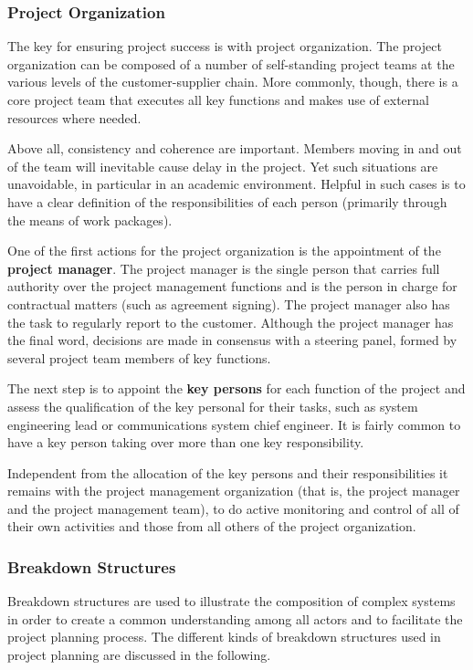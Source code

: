 \subsubsection{Project Organization}

The key for ensuring project success is with project organization. The project organization can be composed of a number of self-standing project teams at the various levels of the customer-supplier chain. More commonly, though, there is a core project team that executes all key functions and makes use of external resources where needed. 

Above all, consistency and coherence are important. Members moving in and out of the team will inevitable cause delay in the project. Yet such situations are unavoidable, in particular in an academic environment. Helpful in such cases is to have a clear definition of the responsibilities of each person (primarily through the means of work packages). 

One of the first actions for the project organization is the appointment of the \textbf{project manager}. The project manager is the single person that carries full authority over the project management functions and is the person in charge for contractual matters (such as agreement signing). The project manager also has the task to regularly report to the customer. Although the project manager has the final word, decisions are made in consensus with a steering panel, formed by several project team members of key functions. 

The next step is to appoint the \textbf{key persons} for each function of the project and assess the qualification of the key personal for their tasks, such as system engineering lead or communications system chief engineer. It is fairly common to have a key person taking over more than one key responsibility.

Independent from the allocation of the key persons and their responsibilities it remains with the project management organization (that is, the project manager and the project management team), to do active monitoring and control of all of their own activities and those from all others of the project organization. 

\subsubsection{Breakdown Structures}

Breakdown structures are used to illustrate the composition of complex systems in order to create a common understanding among all actors and to facilitate the project planning process. The different kinds of breakdown structures used in project planning are discussed in the following.

